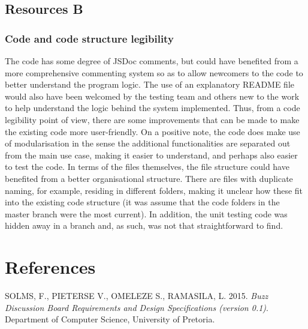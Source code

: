 \documentclass[a4paper]{article}
\begin{document}
\subsection {Resources B}
\subsubsection {Code and code structure legibility}
The code has some degree of JSDoc comments, but could have benefited from a more comprehensive commenting system so as to allow newcomers to the code to better understand the program logic. The use of an explanatory README file would also have been welcomed by the testing team and others new to the work to help understand the logic behind the system implemented. Thus, from a code legibility point of view, there are some improvements that can be made to make the existing code more user-friendly. On a positive note, the code does make use of modularisation in the sense the additional functionalities are separated out from the main use case, making it easier to understand, and perhaps also easier to test the code.
In terms of the files themselves, the file structure could have benefited from a better organisational structure. There are files with duplicate naming, for example, residing in different folders, making it unclear how these fit into the existing code structure (it was assume that the code folders in the master branch were the most current).  In addition, the unit testing code was hidden away in a branch and, as such, was not that straightforward to find.


\section {References}
SOLMS, F., PIETERSE V., OMELEZE S., RAMASILA, L. 2015. \textit{Buzz Discussion Board Requirements and Design Specifications (version 0.1)}. Department of Computer Science, University of Pretoria.
\end{document}
